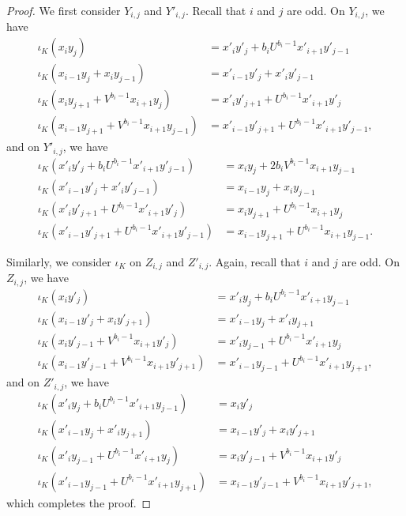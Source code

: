\documentclass[11pt, reqno]{amsart}
\theoremstyle{definition}
\theoremstyle{remark}
\numberwithin{equation}{section}
\begin{document}
\begin{proof}
We first consider $Y_{i,j}$ and $Y'_{i,j}$. Recall that $i$ and $j$ are odd. On $Y_{i,j}$, we have
\begin{align*}
	\iota_K(x_iy_j) &= x'_i y'_j + b_i U^{b_i-1}x'_{i+1} y'_{j-1} \\
	\iota_K( x_{i-1}y_{j}+x_i y_{j-1}) &= x'_{i-1}y'_{j}+x'_i y'_{j-1} \\	
	\iota_K( x_i y_{j+1} + V^{b_i-1}x_{i+1}y_{j}) &= x'_i y'_{j+1} + U^{b_i-1}x'_{i+1}y'_{j} \\	
	\iota_K( x_{i-1}y_{j+1}+V^{b_i-1}x_{i+1} y_{j-1}) &= x'_{i-1}y'_{j+1}+U^{b_i-1}x'_{i+1} y'_{j-1},
\end{align*}
and on $Y'_{i,j}$, we have
\begin{align*}
	\iota_K(x'_iy'_j+ b_i U^{b_i-1}x'_{i+1} y'_{j-1} ) &= x_i y_j + 2b_i V^{b_i-1}x_{i+1} y_{j-1} \\
	\iota_K( x'_{i-1}y'_{j}+x'_i y'_{j-1}) &= x_{i-1}y_{j}+x_i y_{j-1} \\	
	\iota_K( x'_i y'_{j+1} + U^{b_i-1}x'_{i+1}y'_{j}) &= x_i y_{j+1} + U^{b_i-1}x_{i+1}y_{j} \\	
	\iota_K( x'_{i-1}y'_{j+1}+U^{b_i-1}x'_{i+1} y'_{j-1}) &= x_{i-1}y_{j+1}+U^{b_i-1}x_{i+1} y_{j-1}.
\end{align*}

Similarly, we consider $\iota_K$ on $Z_{i,j}$ and $Z'_{i,j}$. Again, recall that $i$ and $j$ are odd. On $Z_{i,j}$, we have
\begin{align*}
	\iota_K(x_i y'_j ) &= x'_i y_j +  b_i U^{b_i-1}x'_{i+1} y_{j-1} \\
	\iota_K(  x_{i-1}y'_{j}+x_i y'_{j+1}) &=   x'_{i-1}y_{j}+x'_i y_{j+1} \\	
	\iota_K( x_i y'_{j-1} + V^{b_i-1}x_{i+1}y'_{j}) &= x'_i y_{j-1} + U^{b_i-1}x'_{i+1}y_{j} \\	
	\iota_K(  x_{i-1}y'_{j-1}+V^{b_i-1}x_{i+1} y'_{j+1} ) &= x'_{i-1}y_{j-1}+U^{b_i-1}x'_{i+1} y_{j+1},
\end{align*}
and on $Z'_{i,j}$, we have
\begin{align*}
	\iota_K(x'_i y_j +  b_i U^{b_i-1}x'_{i+1} y_{j-1}) &=  x_i y'_j\\
	\iota_K( x'_{i-1}y_{j}+x'_i y_{j+1}) &=  x_{i-1}y'_{j}+x_i y'_{j+1}  \\	
	\iota_K( x'_i y_{j-1} + U^{b_i-1}x'_{i+1}y_{j}) &= x_i y'_{j-1} + V^{b_i-1}x_{i+1}y'_{j} \\	
	\iota_K(  x'_{i-1}y_{j-1}+U^{b_i-1}x'_{i+1} y_{j+1}) &=  x_{i-1}y'_{j-1}+V^{b_i-1}x_{i+1} y'_{j+1},
\end{align*}
which completes the proof.
\end{proof}
\end{document}
